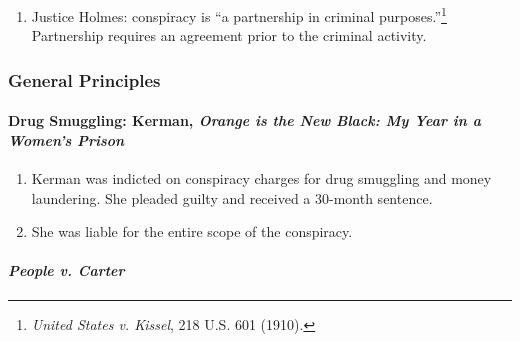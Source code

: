 \begin{enumerate}
    \item Justice Holmes: conspiracy is ``a partnership in criminal 
    purposes.''\footnote{\emph{United States v. Kissel}, 218 U.S. 601 (1910).} 
    Partnership requires an agreement prior to the criminal activity.
\end{enumerate}

\subsubsection{General Principles}

\paragraph{Drug Smuggling: Kerman, \emph{Orange is the New Black: My Year in a 
Women's Prison}}

\begin{enumerate}
    \item Kerman was indicted on conspiracy charges for drug smuggling and 
    money laundering. She pleaded guilty and received a 30-month sentence.
    \item She was liable for the entire scope of the conspiracy.
\end{enumerate}

\paragraph{\emph{People v. Carter}}

